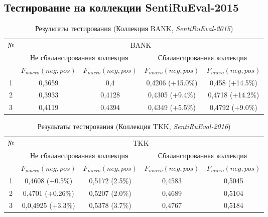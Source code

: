 \subsection{Тестирование на коллекции SentiRuEval-2015}

\begin{table}[!ht]
\centering
\caption{Результаты тестирования (Коллекция BANK, {\it SentiRuEval-2015})}
\label{table:bankResult2015}
\begin{tabular}{|c|c|c|c|c|}
\hline
\multirow{3}{*}{№} & \multicolumn{4}{c|}{BANK}                                                               \\ \cline{2-5}
                   & \multicolumn{2}{c|}{Не сбалансированная коллекция} & \multicolumn{2}{c|}{Сбалансированная коллекция} \\ \cline{2-5}
                   & $F_{macro}(neg, pos)$    & $F_{micro}(neg, pos)$   & $F_{macro}(neg, pos)$  & $F_{micro}(neg, pos)$  \\ \hline
1                  & 0,3659                   & 0,4                     & 0,4206 (+15.0\%)       & 0,458 (+14.5\%)        \\ \hline
2                  & 0,3933                   & 0,4128                  & 0,4305 (+9.4\%)        & 0,4718 (+14.2\%)       \\ \hline
3                  & 0,4119                   & 0,4394                  & 0,4349 (+5.5\%)        & 0,4792 (+9.0\%)        \\ \hline
\end{tabular}
\end{table}

\begin{table}[!ht]
\centering
\caption{Результаты тестирования (Коллекция TKK, {\it SentiRuEval-2016})}
\label{table:tkkResult2015}
\begin{tabular}{|c|c|c|c|c|}
\hline
\multirow{3}{*}{№} & \multicolumn{4}{c|}{TKK}                                                                             \\ \cline{2-5}
                   & \multicolumn{2}{c|}{Не сбалансированная коллекция} & \multicolumn{2}{c|}{Сбалансированная коллекция} \\ \cline{2-5}
                   & $F_{macro}(neg, pos)$    & $F_{micro}(neg, pos)$   & $F_{macro}(neg, pos)$  & $F_{micro}(neg, pos)$  \\ \hline
1                  & 0,4608 (+0.5\%)          & 0,5172 (2.5\%)          & 0,4583                 & 0,5045                 \\ \hline
2                  & 0,4701 (+0.26\%)         & 0,5207 (2.0\%)          & 0,4689                 & 0,5104                 \\ \hline
3                  & 0,0,4925 (+3.3\%)        & 0,5378 (3.7\%)          & 0,4767                 & 0,5184                 \\ \hline
\end{tabular}
\end{table}

%
%
